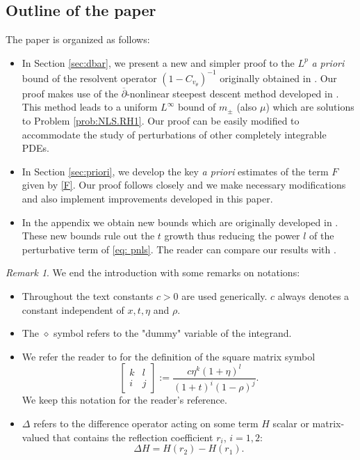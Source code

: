 \documentclass{amsart}
\theoremstyle{plain}
\theoremstyle{remark}
\newtheorem{remark}[theorem]{Remark}
\numberwithin{equation}{section}
\newcommand{\Twomat}[4]
{
\left[
	\begin{array}{cc}
		{#1}	&	{#2}	\\[10pt]
		{#3}	&	{#4}
		\end{array}
\right]
}
\begin{document}
\subsection {Outline of the paper}
The paper is organized as follows:
\begin{itemize}
    \item[1.]In Section \ref{sec:dbar},  we present a new and simpler proof to the $L^p$ \textit{a priori} bound of the resolvent operator  $(1-C_{v_\theta})^{-1}$ originally obtained in \cite{DZ-1}. Our proof makes use of the $\overline{\partial}$-nonlinear steepest descent method developed in \cite{DMM}. This method leads to a uniform $L^\infty$ bound of $m_\pm$ (also $\mu$) which are solutions to Problem \ref{prob:NLS.RH1}. Our proof can be easily modified to accommodate the study of perturbations of other completely integrable PDEs. 
    \item[2.]  In Section \ref{sec:priori}, we develop the key \textit{a priori} estimates of the term $F$ given by \eqref{F}. Our proof follows closely \cite[Section 6]{DZ-2} and we make necessary modifications and also implement improvements developed in this paper. 
    \item[3.] In the appendix we obtain new bounds which are originally developed in \cite[Section 5]{DZ-2}. These new bounds rule out the $t$ growth thus reducing the power $l$ of the perturbative term of \eqref{eq: pnls}. The reader can compare our results with \cite[Lemma 5.29, Lemma 5.36]{DZ-2}. 
\end{itemize}

\begin{remark}
We end the introduction with some remarks on notations:
\begin{itemize}
    \item Throughout the text constants $c> 0$ are used generically. $c$ always denotes a constant independent of $x, t, \eta$ and $\rho$.
    \item The $\diamond$ symbol refers to the "dummy" variable of the integrand.
    \item We refer the reader to \cite[(4.1)-(4.3)]{DZ-2} for the definition of the square matrix symbol
$$\Twomat{k}{l}{i}{j}:=\frac{c\eta^k(1+\eta)^l}{(1+t)^i(1-\rho)^j}.$$
We keep this notation for the reader's reference. 
\item  $\Delta$ refers to the difference operator acting on some term $H$ scalar or matrix-valued that contains the reflection coefficient $r_i$, $i=1,2$:
$$\Delta H=H(r_2)-H(r_1).$$
\end{itemize}
 

\end{remark}
\end{document}

